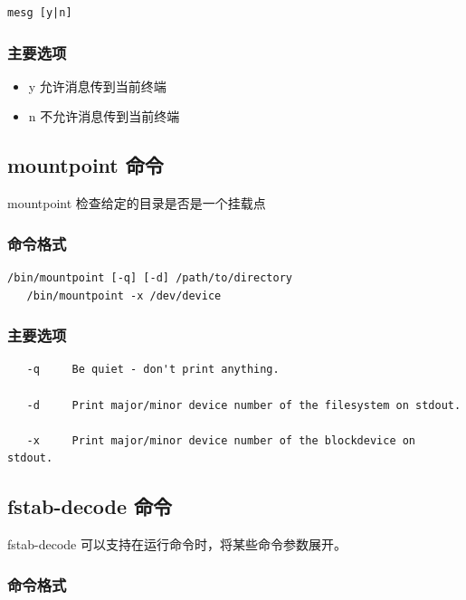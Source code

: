 {\begin{shaded}\begin{verbatim}
mesg [y|n]
\end{verbatim}\end{shaded}}
\subsubsection{主要选项}

\begin{itemize}
\item
  y 允许消息传到当前终端
\item
  n 不允许消息传到当前终端
\end{itemize}
\subsection{mountpoint 命令}

mountpoint 检查给定的目录是否是一个挂载点

\subsubsection{命令格式}

{\begin{shaded}\begin{verbatim}
/bin/mountpoint [-q] [-d] /path/to/directory
   /bin/mountpoint -x /dev/device
\end{verbatim}\end{shaded}}
\subsubsection{主要选项}

{\begin{shaded}\begin{verbatim}
   -q     Be quiet - don't print anything.

   -d     Print major/minor device number of the filesystem on stdout.

   -x     Print major/minor device number of the blockdevice on stdout.
\end{verbatim}\end{shaded}}
\subsection{fstab-decode 命令}

fstab-decode 可以支持在运行命令时，将某些命令参数展开。

\subsubsection{命令格式}

